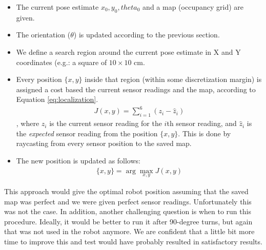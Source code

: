 \begin{itemize}
\item The current pose estimate ${x_0, y_0, theta_0}$ and a map (occupancy grid) are given.

\item The orientation ($\theta$) is updated according to the previous section.

\item We define a search region around the current pose estimate in X and Y coordinates (e.g.: a square of $10\times10$ cm.
\item Every position $\{x,y\}$ inside that region (within some discretization margin) is assigned a cost based the current sensor readings and the map, according to Equation \ref{eq:localization}.
\begin{align}
\label{eq:localization}
J(x,y) = \sum_{i = 1}^6 (z_i - \hat{z}_i)
\end{align}
, where $z_i$ is the current sensor reading for the $i$th sensor reading, and $\hat{z}_i$ is the \emph{expected} sensor reading from the position $\{x,y\}$. This is done by raycasting from every sensor position to the saved map.

\item The new position is updated as follows:
\begin{align}
\{x,y\} = \arg\max_{x,y}J(x,y)
\end{align}

\end{itemize}


This approach would give the optimal robot position assuming that the saved map was perfect and we were given perfect sensor readings. Unfortunately this was not the case. In addition, another challenging question is when to run this procedure. Ideally, it would be better to run it after 90-degree turns, but again that was not used in the robot anymore. We are confident that a little bit more time to improve this and test would have probably resulted in satisfactory results.

